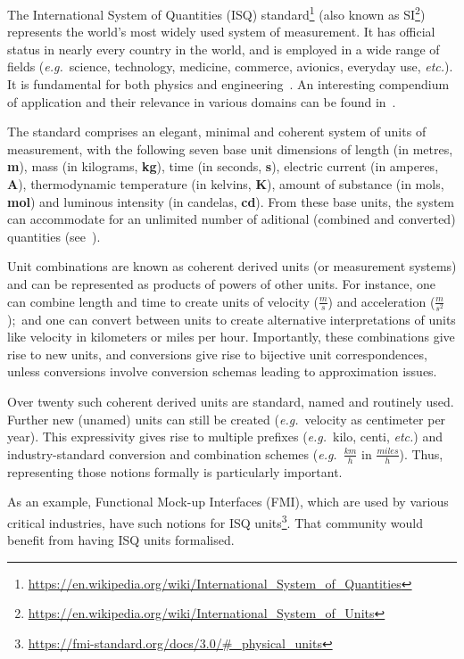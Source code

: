 \documentclass[runningheads,a4paper]{llncs}
\begin{document}
The International System of Quantities (ISQ) standard\footnote{\url{https://en.wikipedia.org/wiki/International_System_of_Quantities}} (also known as SI\footnote{\url{https://en.wikipedia.org/wiki/International_System_of_Units}}) represents the world's most widely used system of measurement. It has official status in nearly every country in the world, and is employed in a wide range of fields (\textit{e.g.}~science, technology, medicine, commerce, avionics, everyday use, \textit{etc.}). It is fundamental for both physics and engineering~\cite{bipm-jcgm:2012:VIM}. An interesting compendium of application and their relevance in various domains can be found in~\cite{NPL-book}. 

The standard comprises an elegant, minimal and coherent system of units of measurement, with the following seven base unit dimensions of length (in metres, \textbf{m}), mass (in kilograms, \textbf{kg}), time (in seconds, \textbf{s}), electric current (in amperes, \textbf{A}), thermodynamic temperature (in kelvins, \textbf{K}), amount of substance (in mols, \textbf{mol}) and luminous intensity (in candelas, \textbf{cd}). From these base units, the system can accommodate for an unlimited number of aditional (combined and converted) quantities (see~). 

Unit combinations are known as coherent derived units (or measurement systems) and can be represented as products of powers of other units. For instance, one can combine length and time to create units of velocity (\(\frac{m}{s}\)) and acceleration (\(\frac{m}{s^2}\));~and one can convert between units to create alternative interpretations of units like velocity in kilometers or miles per hour. Importantly, these combinations give rise to new units, and conversions give rise to bijective unit correspondences, unless conversions involve conversion schemas leading to approximation issues. 

Over twenty such coherent derived units are standard, named and routinely used. Further new (unamed) units can still be created (\textit{e.g.}~velocity as centimeter per year). This expressivity gives rise to multiple prefixes (\textit{e.g.}~kilo, centi, \textit{etc.}) and industry-standard conversion and combination schemes (\textit{e.g.}~\(\frac{km}{h}\) in \(\frac{miles}{h}\)). Thus, representing those notions formally is particularly important. 

As an example, Functional Mock-up Interfaces (FMI), which are used by various critical industries, have such notions for ISQ units\footnote{\url{https://fmi-standard.org/docs/3.0/\#_physical_units}}. That community would benefit from having ISQ units formalised.         
\end{document}
